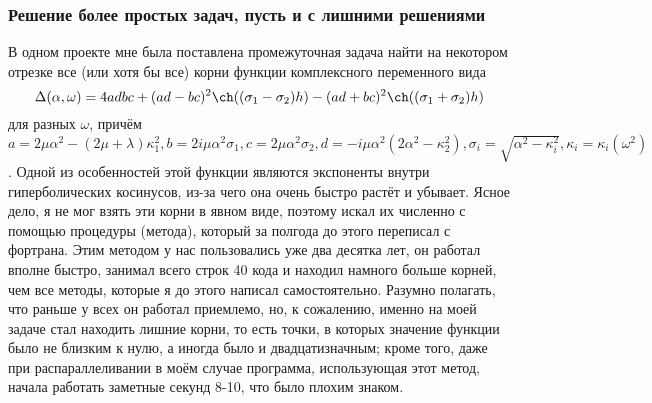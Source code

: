 \documentclass[a4paper, 12pt]{article}
\begin{document}
\subsubsection{Решение более простых задач, пусть и с лишними решениями}
В одном проекте мне была поставлена промежуточная задача найти на некотором отрезке все (или хотя бы все) корни функции комплексного переменного вида
    \begin{equation}
        \Delta(\alpha,\omega)=4adbc+(ad-bc)^2 \ch((\sigma_1-\sigma_2)h)-(ad+bc)^2 \ch((\sigma_1+\sigma_2)h)
    \end{equation}
    для разных $\omega$, причём $a=2\mu\alpha^2-(2\mu+\lambda)\kappa_1^2,b=2i\mu\alpha^2\sigma_1,c=2\mu\alpha^2\sigma_2,d=-i\mu\alpha^2(2\alpha^2-\kappa_2^2),\sigma_i=\sqrt{\alpha^2-\kappa_i^2},\kappa_i=\kappa_i(\omega^2)$.
    Одной из особенностей этой функции являются экспоненты внутри гиперболических косинусов, из-за чего она очень быстро растёт и убывает.    Ясное дело, я не мог взять эти корни в явном виде, поэтому искал их численно с помощью процедуры (метода), который за полгода до этого переписал с фортрана.
    Этим методом у нас пользовались уже два десятка лет, он работал вполне быстро, занимал всего строк 40 кода и находил намного больше корней, чем все методы, которые я до этого написал самостоятельно.
    Разумно полагать, что раньше у всех он работал приемлемо, но, к сожалению, именно на моей задаче стал находить лишние корни, то есть точки, в которых значение функции было не близким к нулю, а иногда было и двадцатизначным; кроме того, даже при распараллеливании в моём случае программа, использующая этот метод, начала работать заметные секунд 8-10, что было плохим знаком.
    
\end{document}
